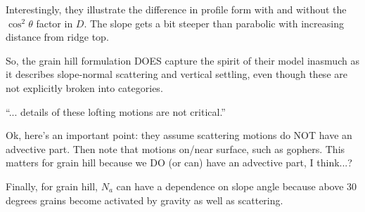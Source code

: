 \documentclass[12pt, oneside]{article}   	%
\begin{document}
Interestingly, they illustrate the difference in profile form with and without the $\cos^2\theta$ factor in $D$. The slope gets a bit steeper than parabolic with increasing distance from ridge top.

So, the grain hill formulation DOES capture the spirit of their model inasmuch as it describes slope-normal scattering and vertical settling, even though these are not explicitly broken into categories.

``... details of these lofting motions are not critical.''

Ok, here's an important point: they assume scattering motions do NOT have an advective part. Then note that motions on/near surface, such as gophers. This matters for grain hill because we DO (or can) have an advective part, I think...?

Finally, for grain hill, $N_a$ can have a dependence on slope angle because above 30 degrees grains become activated by gravity as well as scattering.


\end{document}

